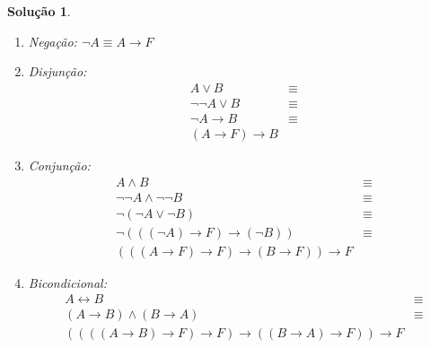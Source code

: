 \documentclass[11pt,a4paper]{report}
\newtheorem*{Solucao}{Solu\c{c}\~ao}
\begin{document}
\begin{enumerate}
\begin{Solucao}
\begin{enumerate}
              \item Nega\c{c}\~ao: $\neg A \equiv A \to F$
              \item Disjun\c{c}\~ao:
                \[
                \begin{array}{lc}
                  A \lor B & \equiv \\
                  \neg \neg A \lor B & \equiv \\
                  \neg A \to B & \equiv \\
                  (A \to F) \to B
                \end{array}
                \]
                \item Conjun\c{c}\~ao:
                  \[
                  \begin{array}{lc}
                    A \land B & \equiv \\
                    \neg \neg A \land \neg \neg B & \equiv \\
                    \neg (\neg A \lor \neg B) & \equiv \\
                    \neg (((\neg A) \to F) \to (\neg B)) & \equiv \\
                    (((A \to F) \to F) \to (B \to F)) \to F
                  \end{array}
                  \]
                  \item Bicondicional:
                  \[
                  \begin{array}{lc}
                  A \leftrightarrow B & \equiv \\
                  (A \to B) \land (B \to A) & \equiv \\
                  ((((A \to B) \to F) \to F) \to ((B \to A) \to F))
                  \to F
                  \end{array}
                  \]  
            \end{enumerate}
          \end{Solucao}
\end{enumerate}
\end{document}
